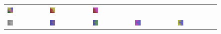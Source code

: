 \begin{figure}[h!]
\begin{tabular}{C{0.19\textwidth}C{0.19\textwidth}C{0.19\textwidth}C{0.19\textwidth}C{0.19\textwidth}}
		\includegraphics[width=0.15\textwidth]{images/gen/activation_functions/p03_02.png_relu.png} &
		\includegraphics[width=0.15\textwidth]{images/gen/activation_functions/p03_02.png_sigmoid.png} &
		\includegraphics[width=0.15\textwidth]{images/gen/activation_functions/p03_02.png_tanh.png} \\
		\includegraphics[width=0.15\textwidth]{images/p03/p03_03.png} &
		\includegraphics[width=0.15\textwidth]{images/gen/activation_functions/p03_03.png_None.png} &
		\includegraphics[width=0.15\textwidth]{images/gen/activation_functions/p03_03.png_relu.png} &
		\includegraphics[width=0.15\textwidth]{images/gen/activation_functions/p03_03.png_sigmoid.png} &
		\includegraphics[width=0.15\textwidth]{images/gen/activation_functions/p03_03.png_tanh.png} \\

\end{tabular}
\end{figure}
